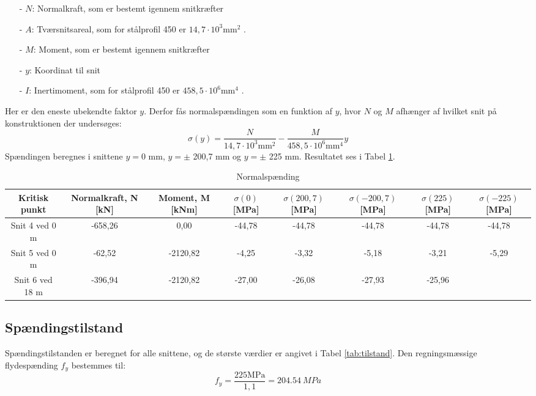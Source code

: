 \begin{itemize}
	\item[-] $N$: Normalkraft, som er bestemt igennem snitkræfter
	\item[-] $A$: Tværsnitsareal, som for stålprofil 450 er $14,\!7 \cdot 10^3 \text{mm}^2$ \citep{stabi}. 
	\item[-] $M$: Moment, som er bestemt igennem snitkræfter
	\item[-] $y$: Koordinat til snit
	\item[-] $I$: Inertimoment, som for stålprofil 450 er $458,\!5 \cdot 10^6 \text{mm}^4$ \citep{stabi}. 
\end{itemize} 

Her er den eneste ubekendte faktor $y$. Derfor fås normalspændingen som en funktion af $y$, hvor $N$ og $M$ afhænger af hvilket snit på konstruktionen der undersøges:
\begin{equation}
	\sigma(y) = \frac{N}{14,\!7 \cdot 10^3 \text{mm}^2} - \frac{M}{458,\!5 \cdot 10^6 \text{mm}^4} y
\end{equation}
Spændingen beregnes i snittene $y = 0$ mm, $y = \pm$ 200,7 mm og $y = \pm$ 225 mm. Resultatet ses i Tabel \ref{tab:normalspanding}.

\begin{table} [H]
	\begin{center}
		\begin{tabular}{c c c c c c c c }
			\hline
			Kritisk punkt   & Normalkraft, N [kN] & Moment, M [kNm] & $\sigma(0)$[MPa] & $\sigma(200,7)$[MPa] & $\sigma(-200,7)$[MPa] & $\sigma(225)$[MPa] & $\sigma(-225)$[MPa] \\ \hline
			Snit 4 ved 0 m  & -658,26           & 0,00                   & -44,78      & -44,78          & -44,78          & -44,78        & -44,78       \\ \hline
			Snit 5 ved 0 m  & -62,52          & -2120,82      & -4,25     & -3,32         & -5,18          & -3,21        & -5,29        \\ \hline
			Snit 6 ved 18 m & -396,94           & -2120,82        & -27,00      & -26,08         & -27,93          & -25,96        &                      \\ \hline
		\end{tabular}
		\caption{Normalspænding}
		\label{tab:normalspanding}
	\end{center}
\end{table}

\subsection{Spændingstilstand}
Spændingstilstanden er beregnet for alle snittene, og de største værdier er angivet i Tabel \ref{tab:tilstand}.
\newline
\newline
Den regningsmæssige flydespænding $f_y$ bestemmes til:
\begin{equation}
f_y = \frac{225 \text{MPa}}{1,\!1} = \SI{204,54}{MPa}
\end{equation}


